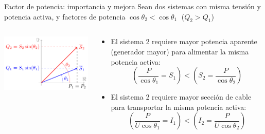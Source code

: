 \documentclass[aspectratio=169, usenames,svgnames,dvipsnames]{beamer}
\begin{document}
\begin{frame}{Factor de potencia: \hspace{3mm}importancia y mejora}
    Sean dos sistemas con \alert{misma tensión y potencia activa}, y factores de potencia \(\cos \theta_2 < \cos \theta_1 \;\) (\(Q_2 > Q_1\))
    \begin{columns}
    \begin{column}{0.4\linewidth}    
        \hspace{-3mm}\includegraphics[width=1.05\linewidth]{../figs/fasorescompensacionreactiva.pdf}
    \end{column}
    \begin{column}{0.6\linewidth}
    \begin{itemize}
        \item El sistema 2 requiere \alert{mayor potencia aparente} (generador mayor) para alimentar la misma potencia activa:
        \[
          \left(\frac{P}{\cos \theta_1} = S_1 \right) < \left( S_2 = \frac{P}{\cos \theta_2}\right) 
        \]
        \item El sistema 2 requiere \alert{mayor sección de cable} para transportar la misma potencia activa:
        \[
          \left(\frac{P}{U \cos \theta_1} = I_1 \right) < \left( I_2 = \frac{P}{U \cos \theta_2}\right) 
        \]
    \end{itemize}
    \end{column}
    \end{columns}
\end{frame}

\end{document}
